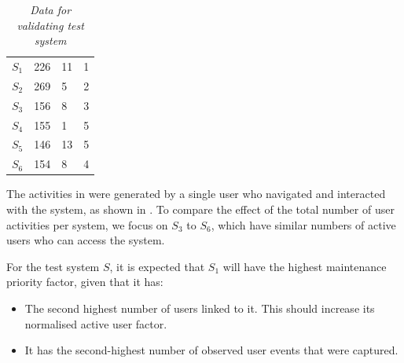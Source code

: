 \begin{table}[!htb]
	\centering
	\caption[Data for validating test system]
	{\textit{Data for validating test system}}
	\label{tbl:ch3_testData}
	\begin{tabularx}{\textwidth}{XXXX}
		\toprule
		\thead{System ($S_X$)} & \thead{Users per system ($P_X$)} & \thead{Number of events ($A_X$)} & \thead{Expected priority} \\
		\midrule
		\rowcolor{lightgray}
		$S_1$ & 226 & 11 & 1 \\
		$S_2$ & 269 & 5 & 2 \\
		\rowcolor{lightgray}
		$S_3$ & 156 & 8 & 3 \\
		$S_4$ & 155 & 1 & 5 \\
		\rowcolor{lightgray}
		$S_5$ & 146 & 13 & 5 \\
		$S_6$ & 154 & 8 & 4 \\
		\bottomrule
	\end{tabularx}
\end{table}

The activities in  were generated by a single user who navigated and interacted with the system, as shown in . To compare the effect of the total number of user activities per system, we focus on $S_3$ to $S_6$, which have similar numbers of active users who can access the system.\par For the test system $S$, it is expected that $S_1$ will have the highest maintenance priority factor, given that it has:

\begin{itemize}
	\item The second highest number of users linked to it. This should increase its normalised active user factor.
	\item It has the second-highest number of observed user events that were captured.
\end{itemize}

